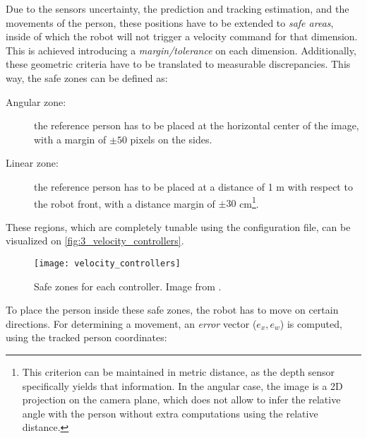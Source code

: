 Due to the sensors uncertainty, the prediction and tracking estimation, and the movements of the person, these positions have to be extended to \textit{safe areas}, inside of which the robot will not trigger a velocity command for that dimension. This is achieved introducing a \textit{margin/tolerance} on each dimension. Additionally, these geometric criteria have to be translated to measurable discrepancies. This way, the safe zones can be defined as:

\begin{description}
	\item[Angular zone:] the reference person has to be placed at the horizontal center of the image, with a margin of $\pm 50$ pixels on the sides.
	\item[Linear zone:] the reference person has to be placed at a distance of 1 m with respect to the robot front, with a distance margin of $\pm 30$ cm\footnote{This criterion can be maintained in metric distance, as the depth sensor specifically yields that information. In the angular case, the image is a 2D projection on the camera plane, which does not allow to infer the relative angle with the person without extra computations using the relative distance.}.
\end{description}

These regions, which are completely tunable using the configuration file, can be visualized on \autoref{fig:3_velocity_controllers}.

\begin{figure}[h]
	\centering
	\texttt{[image: velocity\_controllers]}
	\caption{Safe zones for each controller. Image from \cite{tfg}.}
	\label{fig:3_velocity_controllers}
\end{figure}

To place the person inside these safe zones, the robot has to move on certain directions. For determining a movement, an \textit{error} vector ($e_x, e_w$) is computed, using the tracked person coordinates:

